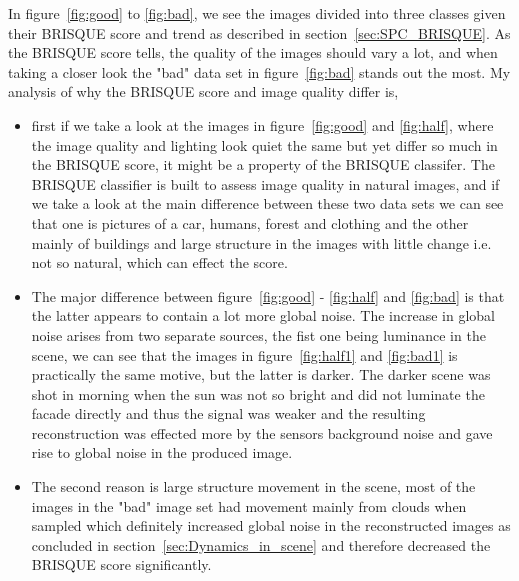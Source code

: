 In figure~\ref{fig:good} to \ref{fig:bad}, we see the images divided into three classes given their BRISQUE score and trend as described in section~\ref{sec:SPC_BRISQUE}. As the BRISQUE score tells, the quality of the images should vary a lot, and when taking a closer look the "bad" data set in figure~\ref{fig:bad} stands out the most. My analysis of why the BRISQUE score and image quality differ is, 

\begin{itemize}
\item first if we take a look at the images in figure~\ref{fig:good} and \ref{fig:half}, where the image quality and lighting look quiet the same but yet differ so much in the BRISQUE score, it might be a property of the BRISQUE classifer. The BRISQUE classifier is built to assess image quality in natural images, and if we take a look at the main difference between these two data sets we can see that one is pictures of a car, humans, forest and clothing and the other mainly of buildings and large structure in the images with little change i.e. not so natural, which can effect the score.

\item The major difference between figure~\ref{fig:good} - \ref{fig:half} and \ref{fig:bad} is that the latter appears to contain a lot more global noise. The increase in global noise arises from two separate sources, the fist one being luminance in the scene, we can see that the images in figure~\ref{fig:half1} and \ref{fig:bad1} is practically the same motive, but the latter is darker. The darker scene was shot in morning when the sun was not so bright and did not luminate the facade directly and thus the signal was weaker and the resulting reconstruction was effected more by the sensors background noise and gave rise to global noise in the produced image. 

\item The second reason is large structure movement in the scene, most of the images in the "bad" image set had movement mainly from clouds when sampled which definitely increased global noise in the reconstructed images as concluded in section~\ref{sec:Dynamics_in_scene} and therefore decreased the BRISQUE score significantly.

\end{itemize}

